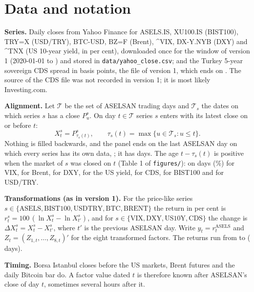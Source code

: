 \documentclass[11pt,a4paper]{article}
\begin{document}
\section{Data and notation}

\textbf{Series.} Daily closes from Yahoo Finance for ASELS.IS, XU100.IS (BIST100), TRY=X (USD/TRY), BTC-USD, BZ=F (Brent),
\^{}VIX, DX-Y.NYB (DXY) and \^{}TNX (US 10-year yield, in per cent), downloaded once for the window of version 1 (2020-01-01
to \YahooLast) and stored in \texttt{data/yahoo\_close.csv}; and the Turkey 5-year sovereign CDS spread in basis points, the file
of version 1, which ends on \CdsLast. The source of the CDS file was not recorded in version 1; it is most likely Investing.com.

\textbf{Alignment.} Let $\mathcal T$ be the set of ASELSAN trading days and $\mathcal T_s$ the dates on which series $s$ has a
close $P^{s}_u$. On day $t \in \mathcal T$ series $s$ enters with its latest close on or before $t$:
\begin{equation}
  X^{s}_t = P^{s}_{\tau_s(t)}, \qquad \tau_s(t) = \max\{u \in \mathcal T_s : u \le t\}.
\end{equation}
Nothing is filled backwards, and the panel ends on the last ASELSAN day on which every series has its own data, \LastDay; it has
\PanelDays{} days. The age $t - \tau_s(t)$ is positive when the market of $s$ was closed on $t$ (Table 1 of
\texttt{figures/}): on \CarriedVix{} days (\CarriedPctVix\%) for VIX, \CarriedBrent{} for Brent, \CarriedDxy{} for DXY,
\CarriedUsten{} for the US yield, \CarriedCds{} for CDS, \CarriedBist{} for BIST100 and \CarriedUsdtry{} for USD/TRY.

\textbf{Transformations (as in version 1).} For the price-like series $s \in \{\mathrm{ASELS}, \mathrm{BIST100},
\mathrm{USDTRY}, \mathrm{BTC}, \mathrm{BRENT}\}$ the return in per cent is $r^{s}_t = 100\,(\ln X^{s}_t - \ln X^{s}_{t'})$,
and for $s \in \{\mathrm{VIX}, \mathrm{DXY}, \mathrm{US10Y}, \mathrm{CDS}\}$ the change is $\Delta X^{s}_t = X^{s}_t -
X^{s}_{t'}$, where $t'$ is the previous ASELSAN day. Write $y_t = r^{\mathrm{ASELS}}_t$ and $Z_t = (Z_{1,t}, \dots,
Z_{8,t})'$ for the eight transformed factors. The returns run from \FirstDay{} to \LastDay{} (\ReturnDays{} days).

\textbf{Timing.} Borsa Istanbul closes before the US markets, Brent futures and the daily Bitcoin bar do. A factor value dated
$t$ is therefore known after ASELSAN's close of day $t$, sometimes several hours after it.
\end{document}
